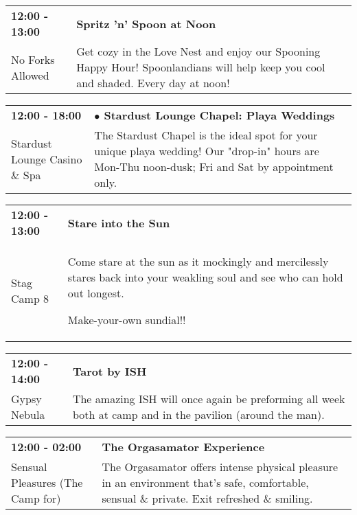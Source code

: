 \begin{tabular}{ p{1in} p{2.2in} }
    \textbf{12:00 - 13:00} & \textbf{Spritz 'n' Spoon at Noon} \\
    No Forks Allowed \newline  & Get cozy in the Love Nest and enjoy our Spooning Happy Hour! Spoonlandians will help keep you cool and shaded. Every day at noon! \\
    \hline 
\end{tabular}
    
\begin{tabular}{ p{1in} p{2.2in} }
    \textbf{12:00 - 18:00} & \textbf{$\bullet$	Stardust Lounge Chapel: Playa Weddings} \\
    Stardust Lounge Casino \& Spa \newline  & The Stardust Chapel is the ideal spot for your unique playa wedding! Our "drop-in" hours are Mon-Thu noon-dusk; Fri and Sat by appointment only. \\
    \hline 
\end{tabular}
    
\begin{tabular}{ p{1in} p{2.2in} }
    \textbf{12:00 - 13:00} & \textbf{Stare into the Sun} \\
    Stag Camp 8 \newline  & Come stare at the sun as it mockingly and mercilessly stares back into your weakling soul and see who can hold out longest.

Make-your-own sundial!! \\
    \hline 
\end{tabular}
    
\begin{tabular}{ p{1in} p{2.2in} }
    \textbf{12:00 - 14:00} & \textbf{Tarot by ISH} \\
    Gypsy Nebula \newline  & The amazing ISH will once again be preforming all week both at camp and in the pavilion (around the man). \\
    \hline 
\end{tabular}
    
\begin{tabular}{ p{1in} p{2.2in} }
    \textbf{12:00 - 02:00} & \textbf{The Orgasamator Experience} \\
    Sensual Pleasures (The Camp for) \newline  & The Orgasamator offers intense physical pleasure in an environment that's safe, comfortable, sensual \& private.  Exit refreshed \& smiling. \\
    \hline 
\end{tabular}
    
